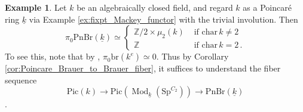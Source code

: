 \documentclass{article}
\DeclareMathOperator{\Mod}{Mod} %
\newcommand{\ZZ}{\mathbb{Z}}
\newcommand{\pnbr}{\ensuremath{\mathrm{PnBr}}}
\newcommand{\pic}{\ensuremath{\mathrm{Pic}}}
\theoremstyle{definition}
\newtheorem{example}[equation]{Example}
\begin{document}
\begin{example}\label{ex:pnbr_closed_point_ramified}
    Let $ k $ be an algebraically closed field, and regard $ k $ as a Poincar\'e ring $ \underline{k} $ via Example \ref{ex:fixpt_Mackey_functor} with the trivial involution.  
    Then 
    \begin{equation*}
        \pi_0\pnbr(\underline{k}) \simeq \begin{cases}
            \ZZ/2\times \mu_2(k) & \text{ if }\mathrm{char}\, k \neq 2 \\
            \ZZ & \text{ if }\mathrm{char}\, k = 2 \,.
        \end{cases} 
    \end{equation*}
    To see this, note that by \cite[Proposition 1.9]{MR2957304}, $ \pi_0 \mathrm{br}(k^e) \simeq 0 $. 
    Thus by Corollary \ref{cor:Poincare_Brauer_to_Brauer_fiber}, it suffices to understand the fiber sequence \[\pic(k)\to \pic(\Mod_{\underline{k}}(\mathrm{Sp}^{C_2})) \to \pnbr(\underline{k})\]. 


\end{example}
\end{document}
